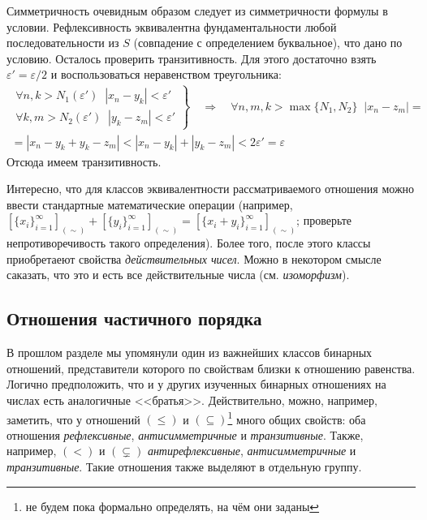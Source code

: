 \begin{Answer}
    \noindent
    Симметричность очевидным образом следует из симметричности формулы в условии.
    Рефлексивность эквивалентна фундаментальности любой последовательности из $ S $ (совпадение с определением буквальное),
    что дано по условию.
    Осталось проверить транзитивность.
    Для этого достаточно взять $ \varepsilon' = \varepsilon / 2 $ и воспользоваться неравенством треугольника:
    \begin{multline*}
        \left .
        \begin{aligned}
            \forall n,k > N_1(\varepsilon') \;\; |x_n - y_k| < \varepsilon' \\
            \forall k,m > N_2(\varepsilon') \;\; |y_k - z_m| < \varepsilon'
        \end{aligned}
        \right \}
        \quad \Longrightarrow \quad
        \forall n, m, k > \max\{N_1, N_2\} \;\; |x_n - z_m| = \\
        = |x_n - y_k + y_k - z_m| < |x_n - y_k| + |y_k - z_m| < 2 \varepsilon' = \varepsilon
    \end{multline*}
    Отсюда имеем транзитивность.

    Интересно, что для классов эквивалентности рассматриваемого отношения можно ввести стандартные математические операции
    (например, $ [\{x_i\}_{i=1}^{\infty}]_{(\sim)} + [\{y_i\}_{i=1}^{\infty}]_{(\sim)} = [\{x_i + y_i\}_{i=1}^{\infty}]_{(\sim)} $;
    проверьте непротиворечивость такого определения).
    Более того, после этого классы приобретаеют свойства \emph{действительных чисел}.
    Можно в некотором смысле саказать, что это и есть все действительные числа (см. \emph{изоморфизм}).
\end{Answer}


\subsection{Отношения частичного порядка}
\label{subsec:binary_relations:order}

В прошлом разделе мы упомянули один из важнейших классов бинарных отношений, представители которого по свойствам близки к отношению равенства.
Логично предположить, что и у других изученных бинарных отношениях на числах есть аналогичные <<братья>>.
Действительно, можно, например, заметить, что у отношений $ (\leqslant) $ и $ (\subseteq) $\footnote{не будем пока формально определять, на чём они заданы}
много общих свойств: оба отношения \emph{рефлексивные}, \emph{антисимметричные} и \emph{транзитивные}.
Также, например, $ (<) $ и $ (\subsetneq) $ \emph{антирефлексивные}, \emph{антисимметричные} и \emph{транзитивные}.
Такие отношения также выделяют в отдельную группу.

